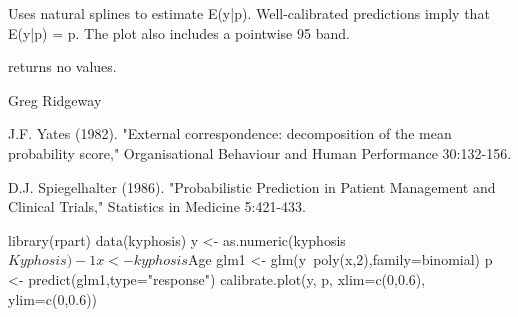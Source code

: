 \begin{Details}\relax
Uses natural splines to estimate E(y|p). Well-calibrated predictions
imply that E(y|p) = p. The plot also includes a pointwise 95
band.
\end{Details}
\begin{Value}
 returns no values.
\end{Value}
\begin{Author}\relax
Greg Ridgeway 
\end{Author}
\begin{References}\relax
J.F. Yates (1982). "External correspondence: decomposition of the mean
probability score," Organisational Behaviour and Human Performance 30:132-156.

D.J. Spiegelhalter (1986). "Probabilistic Prediction in Patient Management
and Clinical Trials," Statistics in Medicine 5:421-433.
\end{References}
\begin{Examples}
\begin{ExampleCode}
library(rpart)
data(kyphosis)
y <- as.numeric(kyphosis$Kyphosis)-1
x <- kyphosis$Age
glm1 <- glm(y~poly(x,2),family=binomial)
p <- predict(glm1,type="response")
calibrate.plot(y, p, xlim=c(0,0.6), ylim=c(0,0.6))
\end{ExampleCode}
\end{Examples}

